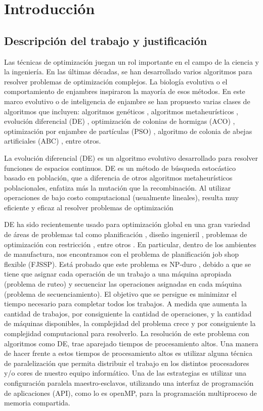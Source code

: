 \chapter{Introducción} 
\section{Descripción del trabajo y justificación} 

Las técnicas de optimización juegan un rol importante en el campo de la ciencia y la ingeniería. En las últimas décadas, se han desarrollado varios algoritmos para resolver problemas de optimización complejos. La biología evolutiva o el comportamiento de enjambres inspiraron la mayoría de esos métodos. En este marco evolutivo o de inteligencia de enjambre se han propuesto varias clases de algoritmos que incluyen: algoritmos genéticos \cite{Goldberg, Holland3}, algoritmos metaheurísticos \cite{Moscato}, evolución diferencial (DE) \cite{StornPrice2}, optimización de colonias de hormigas (ACO) \cite{Colorni}, optimización por enjambre de partículas (PSO) \cite{Eberhart}, algoritmo de colonia de abejas artificiales (ABC) \cite{KarabogaBasturk}, entre otros.


La evolución diferencial (DE) es un algoritmo evolutivo desarrollado para resolver funciones de espacios continuos. DE es un método de búsqueda estocástico basado en población, que a diferencia de otros algoritmos metaheurísticos poblacionales, enfatiza más la mutación que la recombinación. Al utilizar operaciones de bajo costo computacional (usualmente lineales), resulta muy eficiente y eficaz al resolver problemas de optimización


DE ha sido recientemente usado para optimización global en una gran variedad de áreas de problemas tal como planificación \cite{Gnanavel}, diseño ingenieril \cite{Melo}, problemas de optimización con restricción \cite{Ali}, entre otros \cite{Juang,Yang}. En particular, dentro de los ambientes de manufactura, nos encontramos con el problema de planificación job shop flexible (FJSSP). Está probado que este problema es NP-duro \cite{GareyJohnson}, debido a que se tiene que asignar cada operación de un trabajo a una máquina apropiada (problema de ruteo) y secuenciar las operaciones asignadas en cada máquina (problema de secuenciamiento). El objetivo que se persigue es minimizar el tiempo necesario para completar todos los trabajos. A medida que aumenta la cantidad de trabajos, por consiguiente la cantidad de operaciones, y la cantidad de máquinas disponibles, la complejidad del problema crece y por consiguiente la complejidad computacional para resolverlo. La resolución de este problema con algoritmos como DE, trae aparejado tiempos de procesamiento altos. Una manera de hacer frente a estos tiempos de procesamiento altos es utilizar alguna técnica de paralelización que permita distribuir el trabajo en los distintos procesadores y/o cores de nuestro equipo informático. Una de las estrategias es utilizar una configuración paralela maestro-esclavos, utilizando una interfaz de programación de aplicaciones (API), como lo es openMP, para la programación multiproceso de memoria compartida.


